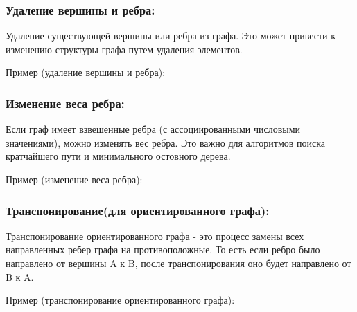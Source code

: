 \documentclass{article}
\begin{document}
\subsubsection*{Удаление вершины и ребра: }
Удаление существующей вершины или ребра из графа. Это может привести к изменению структуры графа путем удаления элементов.

Пример (удаление вершины и ребра):


\subsubsection*{Изменение веса ребра: }
Если граф имеет взвешенные ребра (с ассоциированными числовыми значениями), можно изменять вес ребра. Это важно для алгоритмов поиска кратчайшего пути и минимального остовного дерева.

Пример (изменение веса ребра):


\subsubsection*{Транспонирование(для ориентированного графа): }
Транспонирование ориентированного графа - это процесс замены всех направленных ребер графа на противоположные. То есть если ребро было направлено от вершины A к B, после транспонирования оно будет направлено от B к A.

Пример (транспонирование ориентированного графа):

\end{document}

